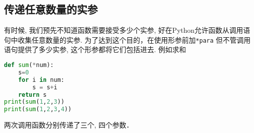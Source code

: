 \subsection{传递任意数量的实参}
有时候, 我们预先不知道函数需要接受多少个实参, 好在Python允许函数从调用语句中收集任意数量的实参. 为了达到这个目的，在使用形参前加\verb|*para| 但不管调用语句提供了多少实参, 这个形参都将它们包括进去. 例如求和
\begin{lstlisting}[language=python]
def sum(*num):
    s=0
    for i in num:
        s = s+i
    return s
print(sum(1,2,3))
print(sum(1,2,3,4))
\end{lstlisting}
两次调用函数分别传递了三个, 四个参数．